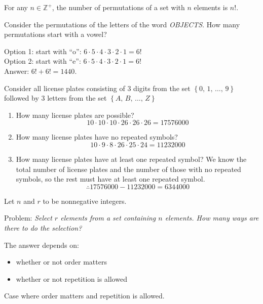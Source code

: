 \begin{theorm}
    For any $n\in\mathbb Z^+$, the number of permutations of a set with $n$ elements is $n!$.
\end{theorm}

\begin{example}
    Consider the permutations of the letters of the word \emph{OBJECTS}. How many permutations start with a vowel?

    Option 1: start with ``o'': $6\cdot 5\cdot 4\cdot 3\cdot 2\cdot 1 = 6!$ \\
    Option 2: start with ``e'': $6\cdot 5\cdot 4\cdot 3\cdot 2\cdot 1 = 6!$
    \\
    Answer: $6!+6! = 1440$.
\end{example}

\begin{example}
    Consider all license plates consisting of 3 digits from the set $\left\{0,\,1,\,\dots,\,9\right\}$ followed by 3 letters from the set $\left\{A,\,B,\,\dots,\,Z\right\}$

    \begin{enumerate}
        \item How many license plates are possible?
        $$10\cdot 10\cdot 10 \cdot 26\cdot 26\cdot 26 = 17576000$$
        \item How many license plates have no repeated symbols?
        $$10\cdot 9\cdot 8\cdot 26\cdot 25\cdot 24 = 11232000$$
        \item How many license plates have at least one repeated symbol?
        We know the total number of license plates and the number of those with no repeated symbols, so the rest must have at least one repeated symbol. $$\therefore 17576000 - 11232000 = 6344000$$
    \end{enumerate}
\end{example}

Let $n$ and $r$ to be nonnegative integers.

Problem: \emph{Select $r$ elements from a set containing $n$ elements. How many ways are there to do the selection?}

The answer depends on:
\begin{itemize}
    \item whether or not order matters
    \item whether or not repetition is allowed
\end{itemize}

Case where order matters and repetition is allowed.

